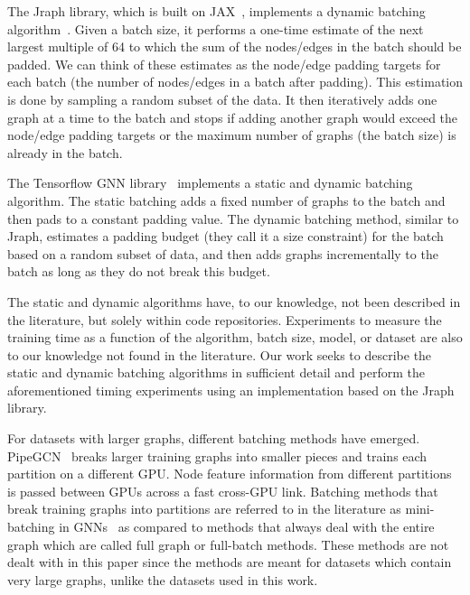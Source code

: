 The Jraph library, which is built on JAX~\cite{jax2018github}, implements a dynamic batching algorithm~\cite{jraph2020github}. Given a batch size, it performs a one-time estimate of the next largest multiple of 64 to which the sum of the nodes/edges in the batch should be padded. We can think of these estimates as the node/edge padding targets for each batch (\ie the number of nodes/edges in a batch after padding). This estimation is done by sampling a random subset of the data. It then iteratively adds one graph at a time to the batch and stops if adding another graph would exceed the node/edge padding targets or the maximum number of graphs (\ie the batch size) is already in the batch.

The Tensorflow GNN library~\cite{ferludin2023tfgnn} implements a static and dynamic batching algorithm. The static batching adds a fixed number of graphs to the batch and then pads to a constant padding value. The dynamic batching method, similar to Jraph, estimates a padding budget (they call it a size constraint) for the batch based on a random subset of data, and then adds graphs incrementally to the batch as long as they do not break this budget.

The static and dynamic algorithms have, to our knowledge, not been described in the literature, but solely within code repositories. Experiments to measure the training time as a function of the algorithm, batch size, model, or dataset are also to our knowledge not found in the literature. Our work seeks to describe the static and dynamic batching algorithms in sufficient detail and perform the aforementioned timing experiments using an implementation based on the Jraph library. 

For datasets with larger graphs, different batching methods have emerged. PipeGCN~\cite{wan2022pipegcn} breaks larger training graphs into smaller pieces and trains each partition on a different GPU. Node feature information from different partitions is passed between GPUs across a fast cross-GPU link. Batching methods that break training graphs into partitions are referred to in the literature as mini-batching in GNNs~\cite{bajaj2024graph} as compared to methods that always deal with the entire graph which are called full graph or full-batch methods. These methods are not dealt with in this paper since the methods are meant for datasets which contain very large graphs, unlike the datasets used in this work.